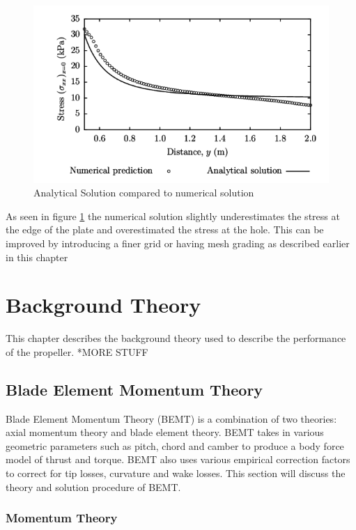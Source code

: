 \documentclass[]{report}
\begin{document}
\begin{figure}
	\centering
	\includegraphics[scale=0.5]{stress_analytical}
	\caption{Analytical Solution compared to numerical solution}
	\label{fig:stress_analytical}
\end{figure}

As seen in figure \ref{fig:stress_analytical} the numerical solution slightly underestimates the stress at the edge of the plate and overestimated the stress at the hole. This can be improved by introducing a finer grid or having mesh grading as described earlier in this chapter


\chapter{Background Theory}
This chapter describes the background theory used to describe the performance of the propeller. *MORE STUFF
\section{Blade Element Momentum Theory}

Blade Element Momentum Theory (BEMT) is a combination of two theories: axial momentum theory and blade element theory. BEMT takes in various geometric parameters such as pitch, chord and camber to produce a body force model of thrust and torque. BEMT also uses various empirical correction factors to correct for tip losses, curvature and wake losses. This section will discuss the theory and solution procedure of BEMT.

\subsection{Momentum Theory}
\end{document}
